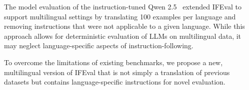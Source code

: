 The model evaluation of the instruction-tuned Qwen 2.5~\cite{qwen2.5} extended IFEval to support multilingual settings by translating 100 examples per language and removing instructions that were not applicable to a given language. While this approach allows for deterministic evaluation of LLMs on multilingual data, it may neglect language-specific aspects of instruction-following.

To overcome the limitations of existing benchmarks, we propose a new, multilingual version of IFEval that is not simply a translation of previous datasets but contains language-specific instructions for novel evaluation.

